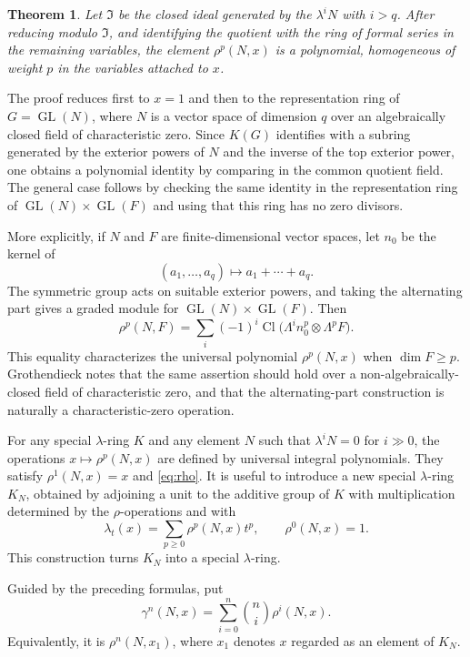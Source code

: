 \documentclass[11pt]{article}
\theoremstyle{plain}
\newtheorem*{theorem*}{Theorem}
\theoremstyle{definition}
\theoremstyle{remark}
\DeclareMathOperator{\GL}{GL}
\providecommand{\Cl}{\operatorname{Cl}}
\begin{document}
\begin{theorem*}
Let $\mathfrak I$ be the closed ideal generated by the $\lambda^iN$ with $i>q$. After reducing modulo $\mathfrak I$, and identifying the quotient with the ring of formal series in the remaining variables, the element $\rho^p(N,x)$ is a polynomial, homogeneous of weight $p$ in the variables attached to $x$.
\end{theorem*}

The proof reduces first to $x=1$ and then to the representation ring of $G=\GL(N)$, where $N$ is a vector space of dimension $q$ over an algebraically closed field of characteristic zero. Since $K(G)$ identifies with a subring generated by the exterior powers of $N$ and the inverse of the top exterior power, one obtains a polynomial identity by comparing in the common quotient field. The general case follows by checking the same identity in the representation ring of $\GL(N)\times\GL(F)$ and using that this ring has no zero divisors.

More explicitly, if $N$ and $F$ are finite-dimensional vector spaces, let $n_0$ be the kernel of
\[
   (a_1,\ldots,a_q)\longmapsto a_1+\cdots+a_q.
\]
The symmetric group acts on suitable exterior powers, and taking the alternating part gives a graded module for $\GL(N)\times\GL(F)$. Then
\begin{equation}\label{eq:rhoalternating}
   \rho^p(N,F)=\sum_i(-1)^i
      \Cl\bigl(\Lambda^i n_0^p\otimes\Lambda^pF\bigr).
\end{equation}
This equality characterizes the universal polynomial $\rho^p(N,x)$ when $\dim F\geq p$. Grothendieck notes that the same assertion should hold over a non-algebraically-closed field of characteristic zero, and that the alternating-part construction is naturally a characteristic-zero operation.

For any special $\lambda$-ring $K$ and any element $N$ such that $\lambda^iN=0$ for $i\gg0$, the operations $x\mapsto\rho^p(N,x)$ are defined by universal integral polynomials. They satisfy $\rho^1(N,x)=x$ and \eqref{eq:rho}. It is useful to introduce a new special $\lambda$-ring $K_N$, obtained by adjoining a unit to the additive group of $K$ with multiplication determined by the $\rho$-operations and with
\[
   \lambda_t(x)=\sum_{p\geq0}\rho^p(N,x)t^p,
   \qquad \rho^0(N,x)=1.
\]
This construction turns $K_N$ into a special $\lambda$-ring.

Guided by the preceding formulas, put
\begin{equation}\label{eq:gammarho}
   \gamma^n(N,x)=\sum_{i=0}^n\binom{n}{i}\rho^i(N,x).
\end{equation}
Equivalently, it is $\rho^n(N,x_1)$, where $x_1$ denotes $x$ regarded as an element of $K_N$.
\end{document}
